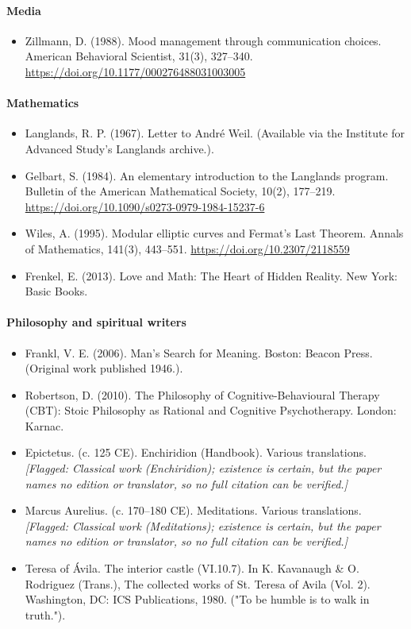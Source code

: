 \documentclass[10pt]{article}
\theoremstyle{remark}
\begin{document}
\paragraph{Media}
\begin{itemize}[leftmargin=1em,itemsep=0pt,topsep=1pt,parsep=0pt]
\item Zillmann, D. (1988). Mood management through communication choices. American Behavioral Scientist, 31(3), 327--340. \url{https://doi.org/10.1177/000276488031003005}
\end{itemize}
\paragraph{Mathematics}
\begin{itemize}[leftmargin=1em,itemsep=0pt,topsep=1pt,parsep=0pt]
\item Langlands, R. P. (1967). Letter to André Weil. (Available via the Institute for Advanced Study's Langlands archive.).
\item Gelbart, S. (1984). An elementary introduction to the Langlands program. Bulletin of the American Mathematical Society, 10(2), 177--219. \url{https://doi.org/10.1090/s0273-0979-1984-15237-6}
\item Wiles, A. (1995). Modular elliptic curves and Fermat's Last Theorem. Annals of Mathematics, 141(3), 443--551. \url{https://doi.org/10.2307/2118559}
\item Frenkel, E. (2013). Love and Math: The Heart of Hidden Reality. New York: Basic Books.
\end{itemize}
\paragraph{Philosophy and spiritual writers}
\begin{itemize}[leftmargin=1em,itemsep=0pt,topsep=1pt,parsep=0pt]
\item Frankl, V. E. (2006). Man's Search for Meaning. Boston: Beacon Press. (Original work published 1946.).
\item Robertson, D. (2010). The Philosophy of Cognitive-Behavioural Therapy (CBT): Stoic Philosophy as Rational and Cognitive Psychotherapy. London: Karnac.
\item Epictetus. (c. 125 CE). Enchiridion (Handbook). Various translations. \textit{[Flagged: Classical work (Enchiridion); existence is certain, but the paper names no edition or translator, so no full citation can be verified.]}
\item Marcus Aurelius. (c. 170--180 CE). Meditations. Various translations. \textit{[Flagged: Classical work (Meditations); existence is certain, but the paper names no edition or translator, so no full citation can be verified.]}
\item Teresa of Ávila. The interior castle (VI.10.7). In K. Kavanaugh \& O. Rodriguez (Trans.), The collected works of St. Teresa of Avila (Vol. 2). Washington, DC: ICS Publications, 1980. ("To be humble is to walk in truth.").
\end{itemize}
\end{document}
